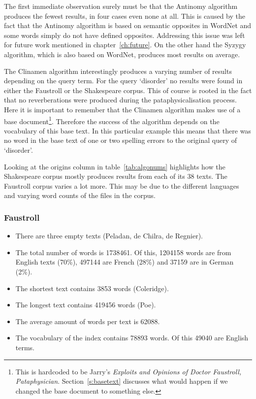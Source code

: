 The first immediate observation surely must be that the Antinomy algorithm produces the fewest results, in four cases even none at all. This is caused by the fact that the Antinomy algorithm is based on semantic opposites in WordNet and some words simply do not have defined opposites. Addressing this issue was left for future work mentioned in chapter~\ref{ch:future}. On the other hand the Syzygy algorithm, which is also based on WordNet, produces most results on average.

The Clinamen algorithm interestingly produces a varying number of results depending on the query term. For the query `disorder' no results were found in either the Faustroll or the Shakespeare corpus. This of course is rooted in the fact that no reverberations were produced during the pataphysicalisation process. Here it is important to remember that the Clinamen algorithm makes use of a base document\footnote{This is hardcoded to be Jarry's \textit{Exploits and Opinions of Doctor Faustroll, Pataphysician}. Section~\ref{s:basetext} discusses what would happen if we changed the base document to something else.}. Therefore the success of the algorithm depends on the vocabulary of this base text. In this particular example this means that there was no word in the base text of one or two spelling errors to the original query of `disorder'.

Looking at the origins column in table~\ref{tab:algonums} highlights how the Shakespeare corpus mostly produces results from each of its 38 texts. The Faustroll corpus varies a lot more. This may be due to the different languages and varying word counts of the files in the corpus.

\subsubsection{Faustroll}
\label{s:fauststats}
\begin{itemize}
  \item There are three empty texts (Peladan, de Chilra, de Regnier).
  \item The total number of words is \num{1738461}. Of this, \num{1204158} words are from English texts (70\%), \num{497144} are French (28\%) and \num{37159} are in German (2\%).
  \item The shortest text contains \num{3853} words (Coleridge).
  \item The longest text contains \num{419456} words (Poe).
  \item The average amount of words per text is \num{62088}.
  \item The vocabulary of the index contains \num{78893} words. Of this \num{49040} are English terms.
\end{itemize}

